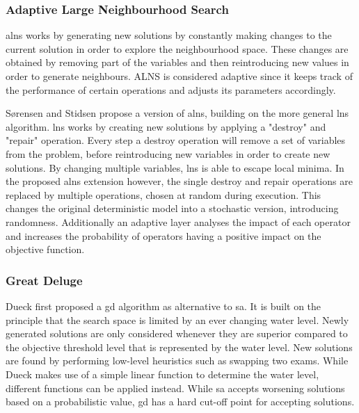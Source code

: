\subsubsection{Adaptive Large Neighbourhood Search}

\acrshort{alns} \cite{ropke2006} works by generating new solutions by constantly making changes to the current solution in order to explore the neighbourhood space. These changes are obtained by removing part of the variables and then reintroducing new values in order to generate neighbours. ALNS is considered adaptive since it keeps track of the performance of certain operations and adjusts its parameters accordingly. 

S{\o}rensen and Stidsen \cite{sorensen2012} propose a version of \acrshort{alns}, building on the more general \acrfull{lns} algorithm. \acrshort{lns} works by creating new solutions by applying a "destroy" and "repair" operation. Every step a destroy operation will remove a set of variables from the problem, before reintroducing new variables in order to create new solutions. By changing multiple variables, \acrshort{lns} is able to escape local minima. In the proposed \acrshort{alns} extension however, the single destroy and repair operations are replaced by multiple operations, chosen at random during execution. This changes the original deterministic model into a stochastic version, introducing randomness. Additionally an adaptive layer analyses the impact of each operator and increases the probability of operators having a positive impact on the objective function.

\subsubsection{Great Deluge}

Dueck \cite{dueck1993} first proposed a \acrfull{gd} algorithm as alternative to \acrlong{sa}. It is built on the principle that the search space is limited by an ever changing water level. Newly generated solutions are only considered whenever they are superior compared to the objective threshold level that is represented by the water level. New solutions are found by performing low-level heuristics such as swapping two exams. While Dueck makes use of a simple linear function to determine the water level, different functions can be applied instead. While \acrlong{sa} accepts worsening solutions based on a probabilistic value, \acrshort{gd} has a hard cut-off point for accepting solutions. 

